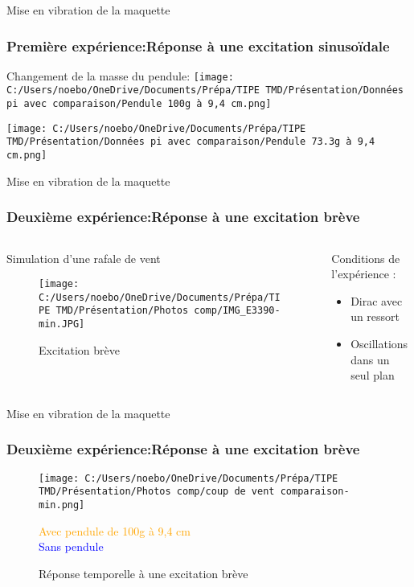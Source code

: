\documentclass{beamer}
\begin{document}
	
	\begin{frame}{Mise en vibration de la maquette}
		\frametitle{Première expérience:Réponse à une excitation sinusoïdale}	
		Changement de la masse du pendule:
		\centering
		\texttt{[image: C:/Users/noebo/OneDrive/Documents/Prépa/TIPE TMD/Présentation/Données pi avec comparaison/Pendule 100g à 9,4 cm.png]}
		
		
		\centering
		\texttt{[image: C:/Users/noebo/OneDrive/Documents/Prépa/TIPE TMD/Présentation/Données pi avec comparaison/Pendule 73.3g à 9,4 cm.png]}
		
		
	\end{frame}
	
	
	
	
	\begin{frame}{Mise en vibration de la maquette}
		\frametitle{Deuxième expérience:Réponse à une excitation brève}
		\begin{columns}
			\begin{column}{0.5\textwidth}
				\alert{Simulation d'une rafale de vent}
				\begin{figure}
					\texttt{[image: C:/Users/noebo/OneDrive/Documents/Prépa/TIPE TMD/Présentation/Photos comp/IMG\_E3390-min.JPG]}
					\caption{Excitation brève}
				\end{figure}
			\end{column}
			\begin{column}{0.5\textwidth}
				Conditions de l'expérience :
				\begin{itemize}
					\item Dirac avec un ressort 
					\item Oscillations dans un seul plan
				\end{itemize}	
			\end{column}
		\end{columns}
	\end{frame}
	
	
	
	
	\begin{frame}{Mise en vibration de la maquette}
		\frametitle{Deuxième expérience:Réponse à une excitation brève}
		\vspace{12pt}
		\begin{figure}
				\texttt{[image: C:/Users/noebo/OneDrive/Documents/Prépa/TIPE TMD/Présentation/Photos comp/coup de vent comparaison-min.png]}
				\caption{Réponse temporelle à une excitation brève}
				\tiny{\small{\textcolor{orange}{Avec pendule de 100g à 9,4 cm}\\
				\textcolor{blue}{Sans pendule}}}
			
			
	\end{figure}
	\end{frame}
\end{document}
